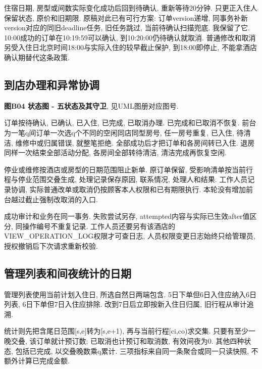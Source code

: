 \documentclass[cn,nofont,11pt,a4paper]{elegantpaper}
\begin{document}
住宿日期, 房型或间数实际变化成功后回到待确认, 重新等待20分钟. 只更正入住人保留状态, 原价和旧期限. 原稿对此已有可行方案: 订单version递增, 同事务补新version对应的同旧deadline任务, 旧任务跳过, 当前待确认扫描兜底. 我保留了它. 10:00成功的订单在10:19:59可以确认, 到10:20:00仍待确认就取消. 普通修改和取消另受入住日北京时间18:00与实际入住的较早截止保护, 到18:00即停止, 不能拿酒店确认期替代这条政策.

\hypertarget{ux5230ux5e97ux529eux7406ux548cux5f02ux5e38ux534fux8c03}{%
\subsection{到店办理和异常协调}\label{ux5230ux5e97ux529eux7406ux548cux5f02ux5e38ux534fux8c03}}

\textbf{图B04 状态图 - 五状态及其守卫}, 见UML图册对应图号.

订单按待确认, 已确认, 已入住, 已完成, 已取消办理. 已完成和已取消不恢复. 前台为一笔q间订单一次选q个不同的空闲同店同型房号, 任一房号重复, 已入住, 待清洁, 维修中或归属错误, 就整笔拒绝. 全部成功后才把订单和各房间转已入住. 退房同样一次结束全部活动分配, 各房间全部转待清洁, 清洁完成再恢复空闲.

停业或维修按酒店或房型的日期范围阻止新单. 原订单保留, 受影响清单按当前行程与停业范围交叠生成, 处理记录保存原因, 联系情况, 处理人和结果. 工作人员记录协调, 实际普通改单或取消仍按顾客本人权限和已有期限执行. 本轮没有增加前台越过截止强制改取消的入口.

成功审计和业务在同一事务. 失败尝试另存, attempted内容与实际已生效after值区分, 同操作编号不重复记录. 工作人员还要另有该酒店的VIEW\_\allowbreak{}OPERATION\_\allowbreak{}LOG权限才可查日志, 人员权限变更日志始终只给管理员, 授权撤销后下次请求重新校验.

\hypertarget{ux7ba1ux7406ux5217ux8868ux548cux95f4ux591cux7edfux8ba1ux7684ux65e5ux671f}{%
\subsection{管理列表和间夜统计的日期}\label{ux7ba1ux7406ux5217ux8868ux548cux95f4ux591cux7edfux8ba1ux7684ux65e5ux671f}}

管理列表使用当前计划入住日, 所选自然日两端包含. 5日下单但6日入住应纳入6日列表, 6日下单但7日入住应排除. 改到7日后立即按新入住日归属, 旧行程从审计追溯.

统计则先把含尾日范围{[}s,e{]}转为{[}s,e+1), 再与当前行程{[}ci,co)求交集. 只要有至少一晚交叠, 该订单就计预订数; 已取消也计预订和取消数, 有效间夜为0. 其他四种状态, 包括已完成, 以交叠晚数乘q累计. 三项指标来自同一条聚合或同一只读快照, 不额外计算已完成金额.
\end{document}
